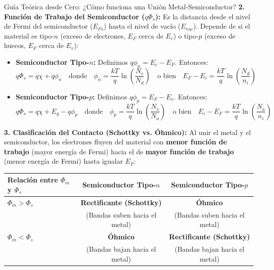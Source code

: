 \documentclass[11pt,a4paper]{article}
\begin{document}
\begin{teoriabox}{Guía Teórica desde Cero: ¿Cómo funciona una Unión Metal-Semiconductor?}
\textbf{2. Función de Trabajo del Semiconductor ($q\Phi_s$):}
Es la distancia desde el nivel de Fermi del semiconductor ($E_{Fs}$) hasta el nivel de vacío ($E_{\text{vac}}$). Depende de si el material es tipo-$n$ (exceso de electrones, $E_F$ cerca de $E_c$) o tipo-$p$ (exceso de huecos, $E_F$ cerca de $E_v$):
\begin{itemize}
    \item \textbf{Semiconductor Tipo-$n$:} Definimos $q\phi_n = E_c - E_F$. Entonces:
    \[
    q\Phi_s = q\chi + q\phi_n \quad \text{donde} \quad \phi_n = \frac{kT}{q}\ln\left(\frac{N_c}{N_d}\right) \quad \text{o bien} \quad E_F - E_i = \frac{kT}{q}\ln\left(\frac{N_d}{n_i}\right)
    \]
    \item \textbf{Semiconductor Tipo-$p$:} Definimos $q\phi_p = E_F - E_v$. Entonces:
    \[
    q\Phi_s = q\chi + E_g - q\phi_p \quad \text{donde} \quad \phi_p = \frac{kT}{q}\ln\left(\frac{N_v}{N_a}\right) \quad \text{o bien} \quad E_i - E_F = \frac{kT}{q}\ln\left(\frac{N_a}{n_i}\right)
    \]
\end{itemize}

\textbf{3. Clasificación del Contacto (Schottky vs. Óhmico):}
Al unir el metal y el semiconductor, los electrones fluyen del material con \textbf{menor función de trabajo} (mayor energía de Fermi) hacia el de \textbf{mayor función de trabajo} (menor energía de Fermi) hasta igualar $E_F$:
\begin{center}
\begin{tabular}{lcc}
\toprule
\textbf{Relación entre $\Phi_m$ y $\Phi_s$} & \textbf{Semiconductor Tipo-$n$} & \textbf{Semiconductor Tipo-$p$} \\
\midrule
$\Phi_m > \Phi_s$ & \textbf{Rectificante (Schottky)} & \textbf{Óhmico} \\
& (Bandas suben hacia el metal) & (Bandas suben hacia el metal) \\
\addlinespace
$\Phi_m < \Phi_s$ & \textbf{Óhmico} & \textbf{Rectificante (Schottky)} \\
& (Bandas bajan hacia el metal) & (Bandas bajan hacia el metal) \\
\bottomrule
\end{tabular}
\end{center}


\end{teoriabox}
\end{document}

